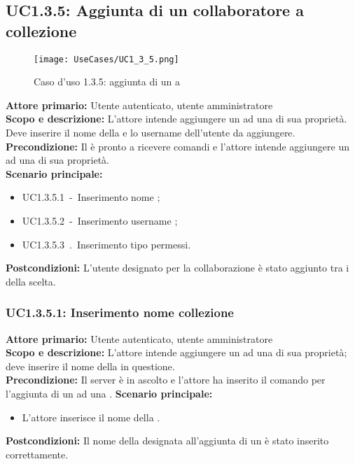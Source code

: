 \documentclass{scalatekids-article}
\begin{document}
\subsection{UC1.3.5: Aggiunta di un collaboratore a collezione}

\begin{figure}[H]
  \begin{center}
    \texttt{[image: UseCases/UC1\_3\_5.png]}
    \caption{Caso d'uso 1.3.5: aggiunta di un  a }
  \end{center}
\end{figure}
\textbf{Attore primario:} Utente autenticato, utente amministratore\\
\textbf{Scopo e descrizione:} L'attore intende aggiungere un  ad una  di sua proprietà. Deve inserire il nome della  e lo username dell'utente da aggiungere.\\
\textbf{Precondizione:} Il  è pronto a ricevere comandi e l'attore intende aggiungere un  ad una  di sua proprietà.\\
\textbf{Scenario principale:}
\begin{itemize}
\item UC1.3.5.1\ -\ Inserimento nome ;
\item UC1.3.5.2\ -\ Inserimento username ;
\item UC1.3.5.3\ .\ Inserimento tipo permessi.
\end{itemize}
\textbf{Postcondizioni:} L'utente designato per la collaborazione è stato aggiunto tra i  della  scelta.

\subsubsection{UC1.3.5.1: Inserimento nome collezione}

\textbf{Attore primario:} Utente autenticato, utente amministratore\\
\textbf{Scopo e descrizione:} L'attore intende aggiungere un  ad una  di sua proprietà; deve inserire il nome della  in questione.\\
\textbf{Precondizione:} Il server è in ascolto e l'attore ha inserito il comando per l'aggiunta di un  ad una .
\textbf{Scenario principale:}
\begin{itemize}
\item L'attore inserisce il nome della .
\end{itemize}
\textbf{Postcondizioni:} Il nome della  designata all'aggiunta di un  è stato inserito correttamente.
\end{document}
